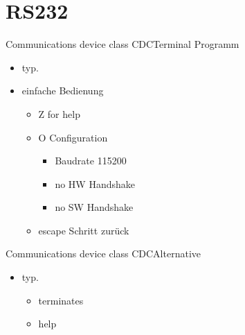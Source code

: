 \section{RS232}
\begin{frame}{Communications device class CDC}{Terminal Programm }
 \begin{itemize}
  \item {}  typ. 
  \item einfache Bedienung
  \begin{itemize} 
   \item {} Z for help
   \item {} O Configuration
   \begin{itemize}
    \item Baudrate 115200
    \item no HW Handshake
    \item no SW Handshake
   \end{itemize}
   \item {} escape Schritt zurück
  \end{itemize}
 \end{itemize}
\end{frame}

\begin{frame}{Communications device class CDC}{Alternative }
 \begin{itemize}
  \item {}  typ. 
  \begin{itemize} 
   \item {} terminates
   \item {} help
  \end{itemize}
 \end{itemize}
\end{frame}
